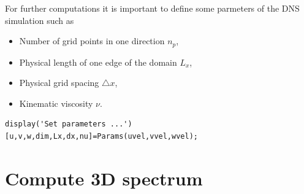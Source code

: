 \documentclass[preprint,12pt,ntfdMod]{elsarticle}
\begin{document}
\begin{par}

For further computations it is important to define some parmeters of the
DNS simulation such as
\begin{itemize}
  \item Number of grid points in one direction $n_{p}$,
  \item Physical length of one edge of the domain $L_x$,
  \item Physical grid spacing $\triangle x$,
  \item Kinematic viscosity $\nu$.
\end{itemize}

\end{par} \vspace{1em}
\begin{verbatim}
display('Set parameters ...')
[u,v,w,dim,Lx,dx,nu]=Params(uvel,vvel,wvel);
\end{verbatim}
\begin{par}



\end{par} \vspace{1em}


\section{Compute 3D spectrum}
\end{document}
